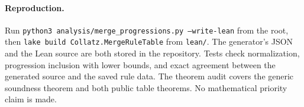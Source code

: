 \documentclass[10pt]{article}
\begin{document}
\paragraph{Reproduction.}
\begingroup\raggedright
Run \texttt{python3 analysis/merge\_progressions.py --write-lean} from the
root, then \texttt{lake build Collatz.MergeRuleTable} from \texttt{lean/}.
The generator's JSON and the Lean source are both stored in the repository.
Tests check normalization, progression inclusion with lower bounds, and
exact agreement between the generated source and the saved rule data.
The theorem audit covers the generic soundness theorem and both public
table theorems. No mathematical priority claim is made.\par\endgroup
\end{document}
